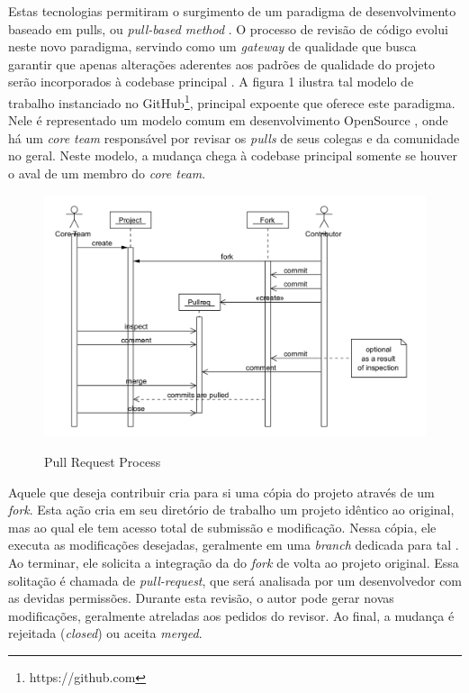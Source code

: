 \documentclass[a4paper,12pt]{monografia}
\theoremstyle{plain}
\theoremstyle{definition}
\theoremstyle{remark}
\begin{document}
  Estas tecnologias permitiram o surgimento de um paradigma de desenvolvimento baseado em pulls, ou \textit{pull-based method} \cite{gousios2014}. O processo de revisão de código evolui neste novo paradigma, servindo como um \textit{gateway} de qualidade que busca garantir que apenas alterações aderentes aos padrões de qualidade do projeto serão incorporados à codebase principal \cite{gousios2015}. A figura 1 ilustra tal modelo de trabalho instanciado no GitHub\footnote{https://github.com}, principal expoente que oferece este paradigma. Nele é representado um modelo comum em desenvolvimento OpenSource \cite{6385140}, onde há um \textit{core team} responsável por revisar os \textit{pulls} de seus colegas e da comunidade no geral. Neste modelo, a mudança chega à codebase principal somente se houver o aval de um membro do \textit{core team}.

   \begin{figure}[!htbp]
    \includegraphics[width=\textwidth]{pull-request-flow}\label{fig:pull-request-flow}
    \caption{Pull Request Process \cite{gousios2014}}
  \end{figure}

  Aquele que deseja contribuir cria para si uma cópia do projeto através de um \textit{fork}. Esta ação cria em seu diretório de trabalho um projeto idêntico ao original, mas ao qual ele tem acesso total de submissão e modificação. Nessa cópia, ele executa as modificações desejadas, geralmente em uma \textit{branch} dedicada para tal \cite{gousios2016}. Ao terminar, ele solicita a integração da  do \textit{fork} de volta ao projeto original. Essa solitação é chamada de \textit{pull-request}, que será analisada por um desenvolvedor com as devidas permissões. Durante esta revisão, o autor pode gerar novas modificações, geralmente atreladas aos pedidos do revisor. Ao final, a mudança é rejeitada (\textit{closed}) ou aceita \textit{merged}.
\end{document}
